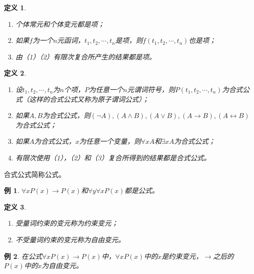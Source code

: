 \documentclass{article}
\newtheorem{Def}{定义}
\newtheorem*{Example}{例}
\begin{document}
\begin{CJK*}{UTF8}{gbsn}
  \begin{Def}$\quad$
    \begin{enumerate}
      \item 个体常元和个体变元都是项；
      \item 如果$f$为一个$n$元函词，$t_1,t_2,\cdots,t_n$是项，则$f(t_1,t_2,\cdots,t_n)$也是项；
      \item 由（1）（2）有限次复合所产生的结果都是项。
    \end{enumerate}
  \end{Def}
  \begin{Def}$\quad$
    \begin{enumerate}
      \item 设$t_1,t_2,\cdots,t_n$为$n$个项，$P$为任意一个$n$元谓词符号，则$P(t_1,t_2,\cdots,t_n)$为合式公式（这样的合式公式又称为原子谓词公式）；
      \item 如果$A,B$为合式公式，则$(\lnot A),(A\land B),(A\lor B),(A\to B),(A\leftrightarrow B)$为合式公式；
      \item 如果$A$为合式公式，$x$为任意一个变量，则$\forall xA$和$\exists xA$为合式公式；    
      \item 有限次使用（1），（2）和（3）复合所得到的结果都是合式公式。
    \end{enumerate}
  \end{Def}
  合式公式简称公式。

  \begin{Example}
    $\forall xP(x)\to P(x)$和$\forall y\forall xP(x)$都是公式。
  \end{Example}
  \begin{Def}$\quad$
  \begin{enumerate}
    \item 受量词约束的变元称为约束变元；
    \item 不受量词约束的变元称为自由变元。
  \end{enumerate}
\end{Def}

\begin{Example}
  在公式$\forall xP(x)\to P(x)$中，$\forall xP(x)$中的$x$是约束变元，$\to$之后的$P(x)$中的$x$为自由变元。
\end{Example}
\end{CJK*}
\end{document}
